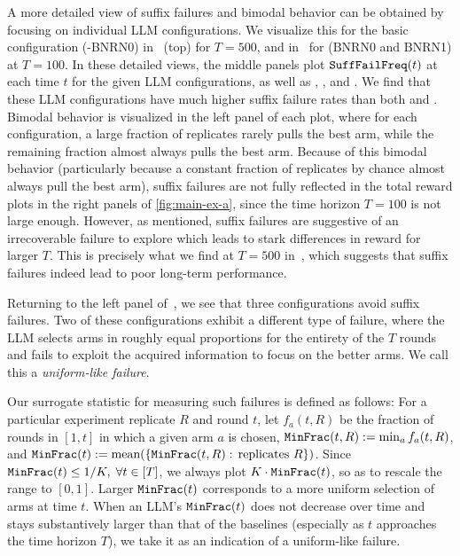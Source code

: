 A more detailed view of suffix failures and bimodal behavior can be
obtained by focusing on individual LLM configurations. We visualize
this for the basic configuration (\gptfour-BNRN0) in~ (top) for $T=500$, and
in~ for \gptfour (BNRN0 and BNRN1) at $T=100$.
In these detailed views, the middle panels plot $\texttt{SuffFailFreq}(t)$ at
each time $t$ for the given LLM configurations, as well as \ucb, \ts, and \greedy. We find that these LLM configurations have much higher suffix failure rates than both \ucb and \ts.
 Bimodal behavior
is visualized in the left panel of each plot, where for each
configuration, a large fraction of replicates rarely pulls the best
arm, while the remaining fraction almost always pulls the best arm.
Because of this bimodal behavior (particularly because a constant
fraction of replicates by chance
almost always pull the best arm), suffix failures are not fully
reflected in the total reward plots in the right panels of \cref{fig:main-ex-a}, since the time horizon $T=100$ is not large enough.  However, as mentioned,
suffix failures are suggestive of an irrecoverable failure to explore
which leads to stark differences in reward for larger $T$.  This
is precisely what we find at $T=500$ in~,
which suggests that suffix failures indeed lead to poor long-term
performance.


Returning to the left panel of~, we see that three \gptfour configurations avoid suffix failures.
Two of these configurations exhibit a different type of failure,
where the LLM selects arms in roughly equal
proportions for the entirety of the $T$ rounds and fails to exploit the acquired information to focus on the better arms.
We call this a \emph{uniform-like failure}.

Our surrogate statistic for measuring such failures is defined as follows: For a particular experiment replicate $R$ and round $t$, let $f_a(t,R)$ be the fraction of rounds in $[1,t]$ in which a given arm $a$ is chosen, 
    $\texttt{MinFrac}(t,R) := \min_a f_a(t,R)$, and
    $\texttt{MinFrac}(t):= \text{mean}(\left\{\texttt{MinFrac}(t,R):\, \text{replicates $R$}\right\}) $.
Since $\texttt{MinFrac}(t) \leq 1/K, \; \forall t \in [T]$, we always plot
    $K\cdot \texttt{MinFrac}(t)$,
so as to rescale the range to $[0,1]$.
Larger $\texttt{MinFrac}(t)$  corresponds to a more uniform selection of arms
at time $t$. When an LLM's $\texttt{MinFrac}(t)$ does not decrease over time
and stays substantively larger than that of the baselines (especially
as $t$ approaches the time horizon $T$), we take it as an indication of a uniform-like failure.


